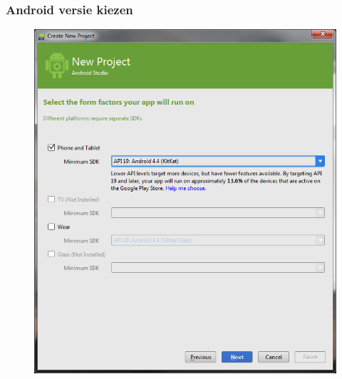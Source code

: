 \documentclass[11pt]{beamer}
\begin{document}
\begin{frame}
\frametitle{Android versie kiezen}
\begin{figure}
\centering
\includegraphics[height=.9\textheight]{./newproject3}
\label{fig:newproject3}
\end{figure}
\end{frame}
\end{document}
